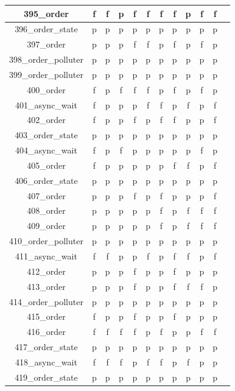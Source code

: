 \documentclass[
fancyheadings, %
%
%
]{stsreprt}
\begin{document}
\begin{longtable}{|c|c|c|c|c|c|c|c|c|c|c|c|}
\hline
395\_order & f & f & p & f & f & f & f & p & f & f \\
\hline
396\_order\_state & p & p & p & p & p & p & p & p & p & p \\
\hline
397\_order & p & p & p & f & f & p & f & p & f & p \\
\hline
398\_order\_polluter & p & p & p & p & p & p & p & p & p & p \\
\hline
399\_order\_polluter & p & p & p & p & p & p & p & p & p & p \\
\hline
400\_order & f & p & f & f & f & p & f & p & f & p \\
\hline
401\_async\_wait & f & p & p & p & f & f & p & f & p & f \\
\hline
402\_order & f & p & p & f & p & f & f & p & p & f \\
\hline
403\_order\_state & p & p & p & p & p & p & p & p & p & p \\
\hline
404\_async\_wait & f & p & f & p & p & p & p & p & f & p \\
\hline
405\_order & f & p & p & p & p & p & f & f & p & f \\
\hline
406\_order\_state & p & p & p & p & p & p & p & p & p & p \\
\hline
407\_order & p & p & p & f & p & f & p & p & p & f \\
\hline
408\_order & p & p & p & p & p & f & p & f & f & f \\
\hline
409\_order & p & p & p & p & p & f & p & f & f & f \\
\hline
410\_order\_polluter & p & p & p & p & p & p & p & p & p & p \\
\hline
411\_async\_wait & f & f & p & p & f & p & f & f & p & f \\
\hline
412\_order & p & p & p & f & p & p & f & p & p & p \\
\hline
413\_order & p & p & p & f & p & p & f & f & f & p \\
\hline
414\_order\_polluter & p & p & p & p & p & p & p & p & p & p \\
\hline
415\_order & f & p & p & f & p & p & f & p & p & p \\
\hline
416\_order & f & f & f & f & p & f & p & p & f & f \\
\hline
417\_order\_state & p & p & p & p & p & p & p & p & p & p \\
\hline
418\_async\_wait & f & f & f & p & f & f & p & f & p & p \\
\hline
419\_order\_state & p & p & p & p & p & p & p & p & p & p \\

\end{longtable}
\end{document}
